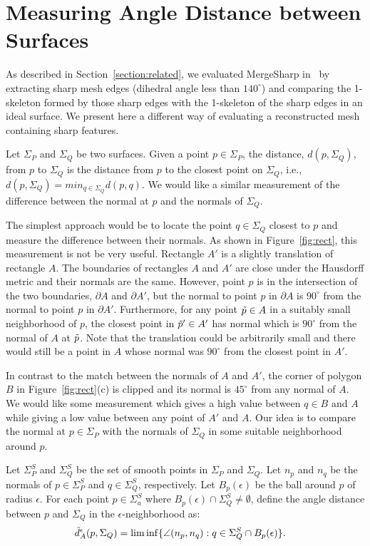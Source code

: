 \section{Measuring Angle Distance between Surfaces}
\label{section:angular_distance}

As described in Section~\ref{section:related},
we evaluated MergeSharp in~\cite{bw-cisec-13}
by extracting sharp mesh edges (dihedral angle less than $140^\circ$)
and comparing the 1-skeleton formed
by those sharp edges with the 1-skeleton of the sharp edges 
in an ideal surface.
We present here a different way of evaluating 
a reconstructed mesh containing sharp features.

Let $\Sigma_P$ and $\Sigma_Q$ be two surfaces.
Given a point $p \in \Sigma_P$,
the distance, $d(p,\Sigma_Q)$, from $p$ to $\Sigma_Q$
is the distance from $p$ to the closest point on $\Sigma_Q$,
i.e., $d(p, \Sigma_Q) = min_{q \in \Sigma_Q} d(p,q)$.
We would like a similar measurement of the difference between
the normal at $p$ and the normals of $\Sigma_Q$.

The simplest approach would be to locate the point $q \in \Sigma_Q$
closest to $p$ and measure the difference 
between their normals.
As shown in Figure~\ref{fig:rect},
this measurement is not be very useful.
Rectangle $A'$ is a slightly translation of rectangle $A$.
The boundaries of rectangles $A$ and $A'$
are close under the Hausdorff metric and their normals are the same.
However, point $p$ is in the intersection of the two boundaries,
$\partial A$ and $\partial A'$,
but the normal to point $p$ in $\partial A$ is $90^\circ$
from the normal to point $p$ in $\partial A'$.
Furthermore, for any point $\tilde{p} \in A$ in a suitably small neighborhood of $p$,
the closest point in $\tilde{p}' \in A'$ has normal which is $90^\circ$
from the normal of $A$ at $\tilde{p}$.
Note that the translation could be arbitrarily small
and there would still be a point in $A$ whose normal was $90^\circ$
from the closest point in $A'$.

In contrast to the match between the normals of $A$ and $A'$, 
the corner of polygon $B$ in Figure~\ref{fig:rect}(c)
is clipped and its normal is $45^\circ$ from any normal of $A$.
We would like some measurement which gives a high value 
between $q \in B$ and $A$ while giving a low value between
any point of $A'$ and $A$.
Our idea is to compare the normal at $p \in \Sigma_P$ 
with the normals of $\Sigma_Q$ in some suitable neighborhood 
around $p$.

Let $\Sigma^S_P$ and $\Sigma^S_Q$ be the set of smooth points
in $\Sigma_P$ and $\Sigma_Q$.
Let $n_p$ and $n_q$ be the normals of $p \in \Sigma^S_P$
and $q \in \Sigma^S_Q$, respectively.
Let $B_p(\epsilon)$ be the ball around $p$ of radius $\epsilon$.
For each point $p \in \Sigma^S_a$ 
where $B_p(\epsilon) \cap \Sigma^S_Q \neq \emptyset$,
define the angle distance between $p$ and $\Sigma_Q$
in the $\epsilon$-neighborhood as:
\begin{align*}
\tilde{d}_A^\epsilon(p,\Sigma_Q) & = \liminf\{ \angle(n_p, n_q) : 
q \in \Sigma^S_Q \cap B_p(\epsilon) \}.
\end{align*}

